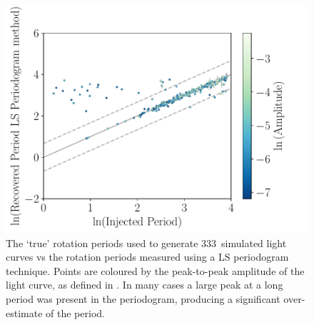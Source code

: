 \documentclass[a4paper,fleqn,usenatbib,useAMS]{mnras}
\newcommand{\naigrain}{333}
\begin{document}

\begin{figure}
\begin{center}
\includegraphics[width=6in, clip=true]{figures/compare_pgram_filtered_35.pdf}
\caption[LS periodogram results.]
{The `true' rotation periods used to generate \naigrain\ simulated light
curves vs the rotation periods measured using a LS periodogram technique.
    Points are coloured by the peak-to-peak amplitude of the light curve, as
    defined in \citet{Aigrain2015}.
In many cases a large peak at a long period was present in the periodogram,
    producing a significant over-estimate of the period.
    }
\label{fig:pgram_compare}
\end{center}
\end{figure}
\end{document}
